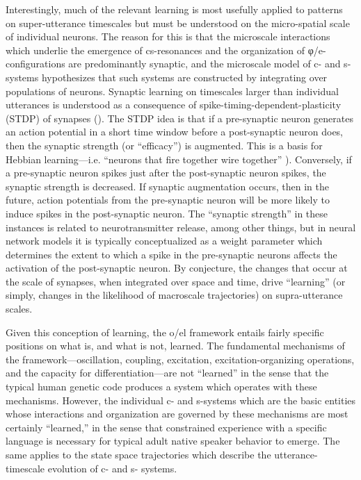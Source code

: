 Interestingly, much of the relevant learning is most usefully applied to patterns on super-utterance timescales but must be understood on the micro-spatial scale of individual neurons. The reason for this is that the microscale interactions which underlie the emergence of cs-resonances and the organization of φ/e-configurations are predominantly synaptic, and the microscale model of c- and s- systems hypothesizes that such systems are constructed by integrating over populations of neurons. Synaptic learning on timescales larger than individual utterances is understood as a consequence of spike-timing-dependent-plasticity (STDP) of synapses (\citealt{AbbottNelson2000,MarkramEtAl1997}). The STDP idea is that if a pre-synaptic neuron generates an action potential in a short time window before a post-synaptic neuron does, then the synaptic strength (or “efficacy”) is augmented. This is a basis for Hebbian learning—i.e. “neurons that fire together wire together” \citep{SongEtAl2000}). Conversely, if a pre-synaptic neuron spikes just after the post-synaptic neuron spikes, the synaptic strength is decreased. If synaptic augmentation occurs, then in the future, action potentials from the pre-synaptic neuron will be more likely to induce spikes in the post-synaptic neuron. The “synaptic strength” in these instances is related to neurotransmitter release, among other things, but in neural network models it is typically conceptualized as a weight parameter which determines the extent to which a spike in the pre-synaptic neurons affects the activation of the post-synaptic neuron. By conjecture, the changes that occur at the scale of synapses, when integrated over space and time, drive “learning” (or simply, changes in the likelihood of macroscale trajectories) on supra-utterance scales. 

  Given this conception of learning, the o/el framework entails fairly specific positions on what is, and what is not, learned. The fundamental mechanisms of the framework—oscillation, coupling, excitation, excitation-organizing operations, and the capacity for differentiation—are not “learned” in the sense that the typical human genetic code produces a system which operates with these mechanisms. However, the individual c- and s-systems which are the basic entities whose interactions and organization are governed by these mechanisms are most certainly “learned,” in the sense that constrained experience with a specific language is necessary for typical adult native speaker behavior to emerge. The same applies to the state space trajectories which describe the utterance-timescale evolution of c- and s- systems.

